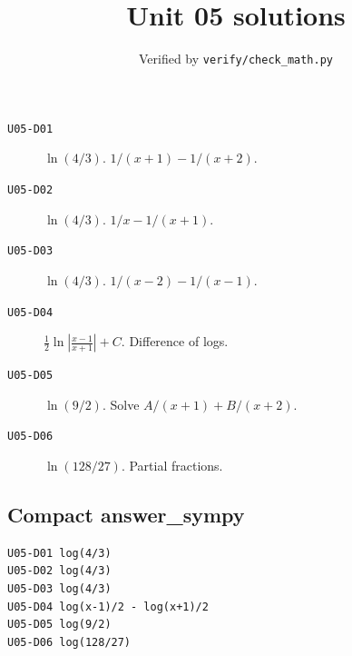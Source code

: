 
\title{Unit 05 solutions}
\author{Verified by \texttt{verify/check\_math.py}}
\date{}

\maketitle
\begin{description}
\item[\texttt{U05-D01}] \(\ln(4/3)\). $1/(x+1)-1/(x+2)$.
\item[\texttt{U05-D02}] \(\ln(4/3)\). $1/x-1/(x+1)$.
\item[\texttt{U05-D03}] \(\ln(4/3)\). $1/(x-2)-1/(x-1)$.
\item[\texttt{U05-D04}] \(\frac12\ln\left|\frac{x-1}{x+1}\right|+C\). Difference of logs.
\item[\texttt{U05-D05}] \(\ln(9/2)\). Solve $A/(x+1)+B/(x+2)$.
\item[\texttt{U05-D06}] \(\ln(128/27)\). Partial fractions.
\end{description}
\subsection*{Compact answer\_sympy}
\begin{verbatim}
U05-D01 log(4/3)
U05-D02 log(4/3)
U05-D03 log(4/3)
U05-D04 log(x-1)/2 - log(x+1)/2
U05-D05 log(9/2)
U05-D06 log(128/27)
\end{verbatim}

